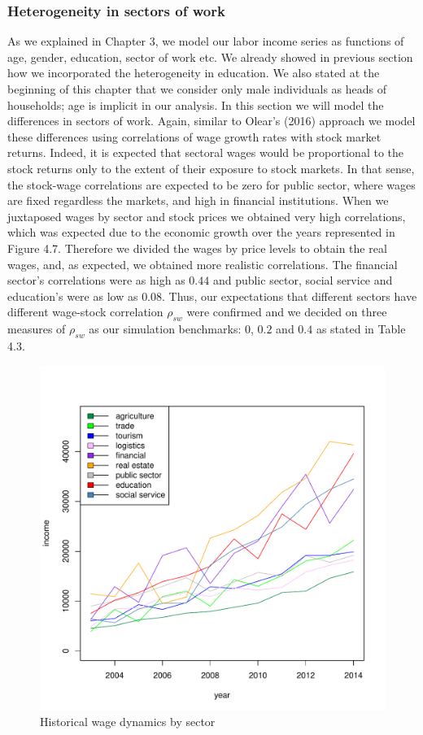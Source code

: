 \subsubsection{Heterogeneity in sectors of work}

As we explained in Chapter 3, we model our labor income series as functions of age, gender, education, sector of work etc. We already showed in previous section how we incorporated the heterogeneity in education. We also stated at the beginning of this chapter that we consider only male individuals as heads of households; age is implicit in our analysis. In this section we will model the differences in sectors of work. Again, similar to Olear's (2016) approach we model these differences using correlations of wage growth rates with stock market returns. Indeed, it is expected that sectoral wages would be proportional to the stock returns only to the extent of their exposure to stock markets. In that sense, the stock-wage correlations are expected to be zero for public sector, where wages are fixed regardless the markets, and high in financial institutions. When we juxtaposed wages by sector and stock prices we obtained very high correlations, which was expected due to the economic growth over the years represented in Figure 4.7. Therefore we divided the wages by price levels to obtain the real wages, and, as expected, we obtained more realistic correlations. The financial sector's correlations were as high as $0.44$  and public sector, social service and education's were as low as $0.08$. Thus, our expectations that different sectors have different wage-stock correlation $\rho_{sw}$ were confirmed and we decided on three measures of $\rho_{sw}$ as our simulation benchmarks: $0$, $0.2$ and $0.4$ as stated in Table 4.3.

\begin{figure}[h]
	\centering
	\includegraphics[scale=0.6]{figs/wage2sec.pdf}
	\caption{Historical wage dynamics by sector}
\end{figure}

